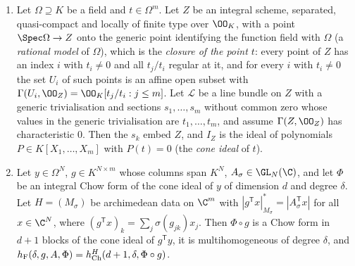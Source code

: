 \begin{lemma}\label{pf:covol:lem:modelform}
\begin{enumerate}[label=(\alph*)]
\item Let $\Omega\supseteq K$ be a field and $t\in\Omega^m$. Let $Z$ be an integral scheme, separated,
  quasi-compact and locally of finite type over $\OO_K$, with a point $\Spec\Omega\to Z$ onto the generic
  point identifying the function field with $\Omega$ (a \emph{rational model} of $\Omega$), which is
  the \emph{closure of the point $t$}: every point of $Z$ has an index $i$ with $t_i\ne0$ and all
  $t_j/t_i$ regular at it, and for every $i$ with $t_i\ne0$ the set $U_i$ of such points is an affine
  open subset with $\Gamma(U_i,\OO_Z)=\OO_K[t_j/t_i:j\le m]$. Let $\mathcal L$ be a line bundle on
  $Z$ with a generic trivialisation and sections $s_1,\dots,s_m$ without common zero whose values in the
  generic trivialisation are $t_1,\dots,t_m$, and assume $\Gamma(Z,\OO_Z)$ has characteristic $0$. Then
  the $s_k$ embed $Z$, and $I_Z$ is the ideal of polynomials $P\in K[X_1,\dots,X_m]$ with $P(t)=0$ (the
  \emph{cone ideal} of $t$).
\item Let $y\in\Omega^N$, $g\in K^{N\times m}$ whose columns span $K^N$, $A_\sigma\in\GL_N(\C)$, and let
  $\Phi$ be an integral Chow form of the cone ideal of $y$ of dimension $d$ and degree $\delta$. Let
  $H=(M_\sigma)$ be archimedean data on $\C^m$ with $|g^{\mathsf T}x|^*_{M_\sigma}=
  |A_\sigma^{\mathsf T}x|$ for all $x\in\C^N$, where $(g^{\mathsf T}x)_k=\sum_j\sigma(g_{jk})x_j$.
  Then $\Phi\circ g$ is a Chow form in $d+1$ blocks of the cone ideal of $g^{\mathsf T}y$, it is
  multihomogeneous of degree $\delta$, and $h_{\mathrm{F}}(\delta,g,A,\Phi)=
  h_{\mathrm{Ch}}^H(d+1,\delta,\Phi\circ g)$.
\end{enumerate}
%
\end{lemma}

